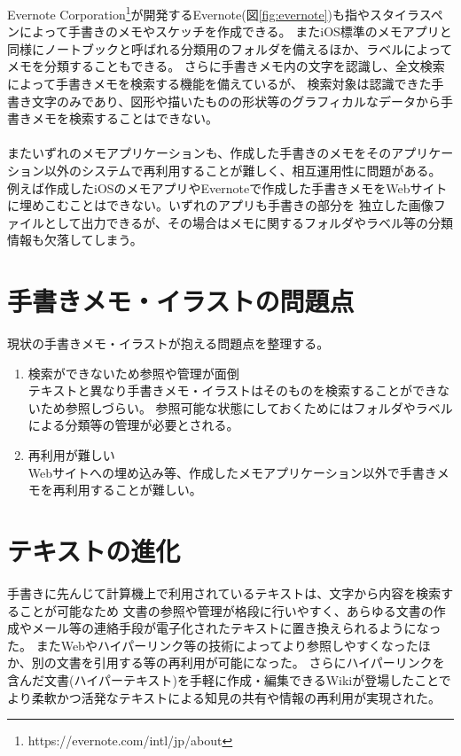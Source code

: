 Evernote Corporation\footnote{https://evernote.com/intl/jp/about}が開発するEvernote(図\ref{fig:evernote})も指やスタイラスペンによって手書きのメモやスケッチを作成できる。
またiOS標準のメモアプリと同様にノートブックと呼ばれる分類用のフォルダを備えるほか、ラベルによってメモを分類することもできる。
さらに手書きメモ内の文字を認識し、全文検索によって手書きメモを検索する機能を備えているが、
検索対象は認識できた手書き文字のみであり、図形や描いたものの形状等のグラフィカルなデータから手書きメモを検索することはできない。
\\
\\
またいずれのメモアプリケーションも、作成した手書きのメモをそのアプリケーション以外のシステムで再利用することが難しく、相互運用性に問題がある。
例えば作成したiOSのメモアプリやEvernoteで作成した手書きメモをWebサイトに埋めこむことはできない。いずれのアプリも手書きの部分を
独立した画像ファイルとして出力できるが、その場合はメモに関するフォルダやラベル等の分類情報も欠落してしまう。


\section{手書きメモ・イラストの問題点}
\label{mondai}
現状の手書きメモ・イラストが抱える問題点を整理する。
\begin{enumerate}
    \item 検索ができないため参照や管理が面倒\\
    テキストと異なり手書きメモ・イラストはそのものを検索することができないため参照しづらい。
    参照可能な状態にしておくためにはフォルダやラベルによる分類等の管理が必要とされる。
    \item 再利用が難しい\\
    Webサイトへの埋め込み等、作成したメモアプリケーション以外で手書きメモを再利用することが難しい。
\end{enumerate}

\section{テキストの進化}
手書きに先んじて計算機上で利用されているテキストは、文字から内容を検索することが可能なため
文書の参照や管理が格段に行いやすく、あらゆる文書の作成やメール等の連絡手段が電子化されたテキストに置き換えられるようになった。
またWebやハイパーリンク等の技術によってより参照しやすくなったほか、別の文書を引用する等の再利用が可能になった。
さらにハイパーリンクを含んだ文書(ハイパーテキスト)を手軽に作成・編集できるWiki\cite{Leuf2001TheWW}が登場したことで
より柔軟かつ活発なテキストによる知見の共有や情報の再利用が実現された。


